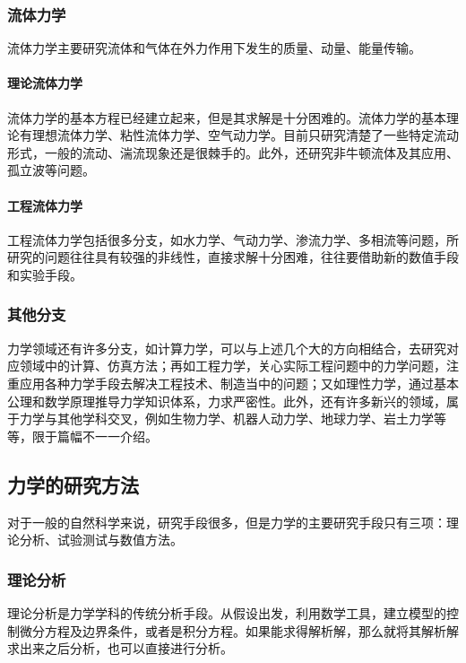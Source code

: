 \subsubsection{流体力学}

流体力学主要研究流体和气体在外力作用下发生的质量、动量、能量传输。

\paragraph{理论流体力学}

流体力学的基本方程已经建立起来，但是其求解是十分困难的。流体力学的基本理论有理想流体力学、粘性流体力学、空气动力学。目前只研究清楚了一些特定流动形式，一般的流动、湍流现象还是很棘手的。此外，还研究非牛顿流体及其应用、孤立波等问题。

\paragraph{工程流体力学}

工程流体力学包括很多分支，如水力学、气动力学、渗流力学、多相流等问题，所研究的问题往往具有较强的非线性，直接求解十分困难，往往要借助新的数值手段和实验手段。

\subsubsection{其他分支}

力学领域还有许多分支，如计算力学，可以与上述几个大的方向相结合，去研究对应领域中的计算、仿真方法；再如工程力学，关心实际工程问题中的力学问题，注重应用各种力学手段去解决工程技术、制造当中的问题；又如理性力学，通过基本公理和数学原理推导力学知识体系，力求严密性。此外，还有许多新兴的领域，属于力学与其他学科交叉，例如生物力学、机器人动力学、地球力学、岩土力学等等，限于篇幅不一一介绍。

\subsection{力学的研究方法}

对于一般的自然科学来说，研究手段很多，但是力学的主要研究手段只有三项：理论分析、试验测试与数值方法。

\subsubsection{理论分析}

理论分析是力学学科的传统分析手段。从假设出发，利用数学工具，建立模型的控制微分方程及边界条件，或者是积分方程。如果能求得解析解，那么就将其解析解求出来之后分析，也可以直接进行分析。

